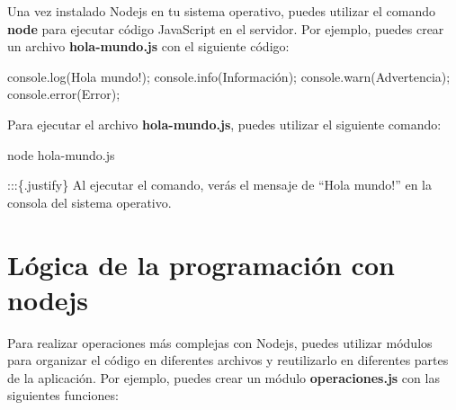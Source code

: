 \documentclass[
  a4paper,
  DIV=11,
  numbers=noendperiod,
  onepage,
  openany]{scrreprt}
\newenvironment{Shaded}{\begin{snugshade}}{\end{snugshade}}
\newcommand{\BuiltInTok}[1]{\textcolor[rgb]{0.00,0.23,0.31}{#1}}
\newcommand{\ExtensionTok}[1]{\textcolor[rgb]{0.00,0.23,0.31}{#1}}
\newcommand{\FunctionTok}[1]{\textcolor[rgb]{0.28,0.35,0.67}{#1}}
\newcommand{\NormalTok}[1]{\textcolor[rgb]{0.00,0.23,0.31}{#1}}
\newcommand{\OperatorTok}[1]{\textcolor[rgb]{0.37,0.37,0.37}{#1}}
\newcommand{\StringTok}[1]{\textcolor[rgb]{0.13,0.47,0.30}{#1}}
\begin{document}
Una vez instalado Nodejs en tu sistema operativo, puedes utilizar el
comando \textbf{node} para ejecutar código JavaScript en el servidor.
Por ejemplo, puedes crear un archivo \textbf{hola-mundo.js} con el
siguiente código:

\begin{Shaded}
\begin{Highlighting}[]
\BuiltInTok{console}\OperatorTok{.}\FunctionTok{log}\NormalTok{(}\StringTok{\textquotesingle{}Hola mundo!\textquotesingle{}}\NormalTok{)}\OperatorTok{;}
\BuiltInTok{console}\OperatorTok{.}\FunctionTok{info}\NormalTok{(}\StringTok{\textquotesingle{}Información\textquotesingle{}}\NormalTok{)}\OperatorTok{;}
\BuiltInTok{console}\OperatorTok{.}\FunctionTok{warn}\NormalTok{(}\StringTok{\textquotesingle{}Advertencia\textquotesingle{}}\NormalTok{)}\OperatorTok{;}
\BuiltInTok{console}\OperatorTok{.}\FunctionTok{error}\NormalTok{(}\StringTok{\textquotesingle{}Error\textquotesingle{}}\NormalTok{)}\OperatorTok{;}
\end{Highlighting}
\end{Shaded}

Para ejecutar el archivo \textbf{hola-mundo.js}, puedes utilizar el
siguiente comando:

\begin{Shaded}
\begin{Highlighting}[]
\ExtensionTok{node}\NormalTok{ hola{-}mundo.js}
\end{Highlighting}
\end{Shaded}

:::\{.justify\} Al ejecutar el comando, verás el mensaje de ``Hola
mundo!'' en la consola del sistema operativo.

\chapter{Lógica de la programación con
nodejs}\label{luxf3gica-de-la-programaciuxf3n-con-nodejs}

Para realizar operaciones más complejas con Nodejs, puedes utilizar
módulos para organizar el código en diferentes archivos y reutilizarlo
en diferentes partes de la aplicación. Por ejemplo, puedes crear un
módulo \textbf{operaciones.js} con las siguientes funciones:
\end{document}
